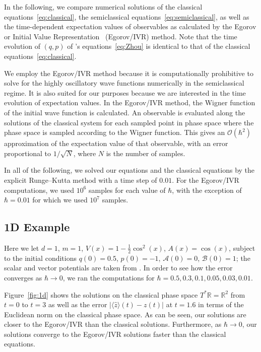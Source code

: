 \documentclass[10pt]{article}
\begin{document}
In the following, we compare numerical solutions of the classical equations~\eqref{eq:classical}, the semiclassical equations~\eqref{eq:semiclassical}, as well as the time-dependent expectation values of observables as calculated by the Egorov \cite{Eg1969,CoRo2012,LaRo2010} or Initial Value Representation~\cite{Mi1970,Mi1974b,WaSuMi1998,Mi2001} (Egorov/IVR) method.
Note that the time evolution of $(q,p)$ of \citeauthor{Zh2014}'s equations~\eqref{eq:Zhou} is identical to that of the classical equations~\eqref{eq:classical}.

We employ the Egorov/IVR method because it is computationally prohibitive to solve for the highly oscillatory wave functions numerically in the semiclassical regime.
It is also suited for our purposes because we are interested in the time evolution of expectation values.
In the Egorov/IVR method, the Wigner function of the initial wave function is calculated. An observable is evaluated along the solutions of the classical system for each sampled point in phase space where the phase space is sampled according to the Wigner function. This gives an $\mathcal{O}(\hbar^2)$ approximation of the expectation value of that observable, with an error proportional to $1/\sqrt{N}$, where $N$ is the number of samples.

In all of the following, we solved our equations and the classical equations by the explicit Runge--Kutta method with a time step of $0.01$. For the Egorov/IVR computations, we used $10^6$ samples for each value of $\hbar$, with the exception of $\hbar = 0.01$ for which we used $10^7$ samples.


\subsection{1D Example}
Here we let $d=1$, $m = 1$, $V(x) = 1 - \frac{1}{2} \cos^2(x)$, $A(x) = \cos(x)$, subject to the initial conditions $q(0) = 0.5$, $p(0) = -1$, $\mathcal{A}(0) = 0$, $\mathcal{B}(0) = 1$; the scalar and vector potentials are taken from \citet[Example~1]{Zh2014}.
In order to see how the error converges as $\hbar \to 0$, we ran the computations for $\hbar = 0.5, 0.3, 0.1, 0.05, 0.03, 0.01$.

Figure~\ref{fig:1d} shows the solutions on the classical phase space $T^{*}\mathbb{R} = \mathbb{R}^{2}$ from $t=0$ to $t=3$ as well as the error $|\langle\hat{z}\rangle(t) - z(t)|$ at $t = 1.6$ in terms of the Euclidean norm on the classical phase space.
As can be seen, our solutions are closer to the Egorov/IVR than the classical solutions. Furthermore, as $\hbar \rightarrow 0$, our solutions converge to the Egorov/IVR solutions faster than the classical equations.
\end{document}
